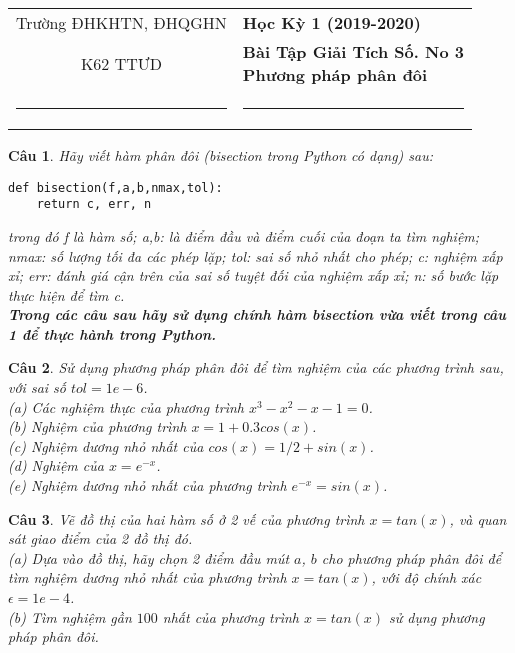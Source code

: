 \documentclass[11pt]{article}
\newtheorem{bt}{Câu}
\begin{document}
\begin{tabular*}
{\linewidth}{c>{\centering\hspace{0pt}} p{}}
Trường ĐHKHTN, ĐHQGHN & {\bf Học Kỳ 1 (2019-2020)}
\tabularnewline
K62 TTƯD & {\bf Bài Tập Giải Tích Số. No 3 \\ Phương pháp phân đôi}
\tabularnewline
\rule{1in}{1pt}  \small  & \rule{2in}{1pt} %
\tabularnewline

\end{tabular*}
%

\begin{bt}
Hãy viết hàm phân đôi (bisection trong Python có dạng) sau:
%
\begin{lstlisting}[frame=single] 
def bisection(f,a,b,nmax,tol):
    return c, err, n
\end{lstlisting}
%
trong đó f là hàm số; a,b: là điểm đầu và điểm cuối của đoạn ta tìm nghiệm; nmax: số lượng tối đa các phép lặp; tol: sai số nhỏ nhất cho phép; c: nghiệm xấp xỉ;
err: đánh giá cận trên của sai số tuyệt đối của nghiệm xấp xỉ; n: số bước lặp thực hiện để tìm c.\\
\textbf{Trong các câu sau hãy sử dụng chính hàm bisection vừa viết trong câu 1 để thực hành trong Python.}
\end{bt}

\begin{bt} 
Sử dụng phương pháp phân đôi để tìm nghiệm của các phương trình sau, với sai số $tol=1e-6$.\\ 
(a) Các nghiệm thực của phương trình $x^3 - x^2 - x - 1 = 0$. \\
(b) Nghiệm của phương trình $x = 1 + 0.3 cos(x)$. \\
(c) Nghiệm dương nhỏ nhất của $cos(x) = 1/2 + sin (x)$. \\
(d) Nghiệm của $x = e^{-x}$. \\
(e) Nghiệm dương nhỏ nhất của phương trình $e^{-x} = sin(x)$. 
\end{bt}

\begin{bt}
	Vẽ đồ thị của hai hàm số ở 2 vế của phương trình $x = tan(x)$, và quan sát giao điểm của 2 đồ thị đó.\\
	(a) Dựa vào đồ thị, hãy chọn 2 điểm đầu mút $a$, $b$ cho phương pháp phân đôi để tìm nghiệm dương nhỏ nhất của phương trình $x = tan (x)$, với độ chính xác 
	$\epsilon=1e-4$. \\
	(b) Tìm nghiệm gần $100$ nhất của phương trình $x = tan(x)$ sử dụng phương pháp phân đôi.
\end{bt}
\end{document}
